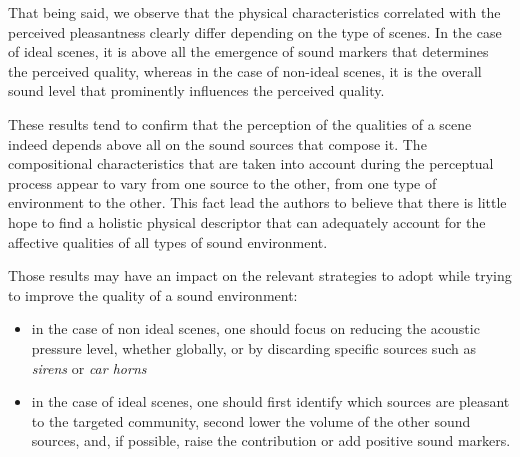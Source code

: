 \documentclass[twoside,twocolumn]{article}
\begin{document}
That being said, we observe that the physical characteristics correlated with the perceived pleasantness clearly differ depending on the type of scenes. In the case of ideal scenes, it is above all the emergence of sound markers that determines the perceived quality, whereas in the case of non-ideal scenes, it is the overall sound level that prominently influences the perceived quality.


These results tend to confirm that the perception of the qualities of a scene indeed depends above all on the sound sources that compose it. The compositional characteristics that are taken into account during the perceptual process appear to vary from one source to the other, from one type of environment to the other. This fact lead the authors to believe that there is little hope to find a holistic physical descriptor that can adequately account for the affective qualities of all types of sound environment.


Those results may have an impact on the relevant strategies to adopt while trying to improve the quality of a sound environment:


\begin{itemize}
\item in the case of non ideal scenes, one should focus on reducing the acoustic pressure level, whether globally, or by discarding specific sources such as \emph{sirens} or \emph{car horns}
\item in the case of ideal scenes, one should first identify which sources are pleasant to the targeted community, second lower the volume of the other sound sources, and, if possible, raise the contribution or add positive sound markers.
\end{itemize}
\end{document}
